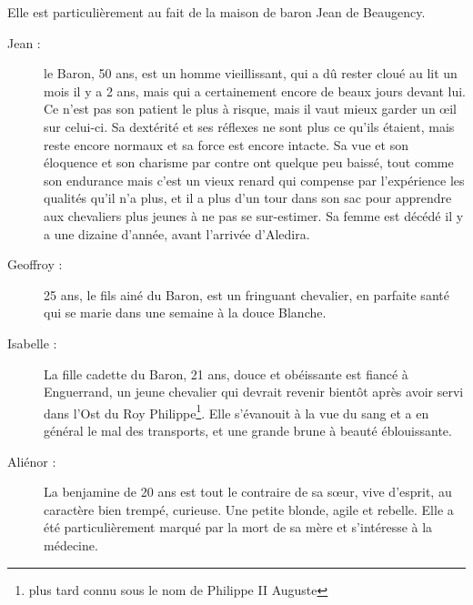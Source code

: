 Elle est particulièrement au fait de la maison de baron Jean de Beaugency.
\begin{description}
\item[Jean :] le Baron, 50 ans, est un homme vieillissant, qui a dû rester cloué au lit un mois
il y a 2 ans, mais qui a certainement encore de beaux jours devant lui. Ce n'est pas son patient le plus à risque, mais il vaut mieux garder un œil sur celui-ci. Sa dextérité et ses réflexes ne sont plus ce qu'ils étaient, mais reste encore normaux et sa force est encore intacte.
Sa vue et son éloquence et son charisme par contre ont quelque peu baissé, tout comme son endurance mais c'est un vieux renard qui compense par l'expérience les qualités qu'il n'a plus, et il a plus d'un tour dans son sac pour apprendre aux chevaliers plus jeunes à ne pas se sur-estimer.
Sa femme est décédé il y a une dizaine d'année, avant l'arrivée d'Aledira.
\item[Geoffroy :] 25 ans, le fils ainé du Baron, est un fringuant chevalier, en parfaite santé qui se marie dans une semaine à la douce Blanche.
\item[Isabelle :] La fille cadette du Baron, 21 ans, douce et obéissante est fiancé à Enguerrand, un jeune chevalier qui devrait revenir bientôt après avoir servi dans l'Ost du Roy Philippe\footnote{plus tard connu sous le nom de Philippe II Auguste}. Elle s'évanouit à la vue du sang et a en général le mal des transports, et une grande brune à beauté éblouissante.
\item[Aliénor :] La benjamine de 20 ans est tout le contraire de sa sœur, vive d'esprit, au caractère bien trempé, curieuse. Une petite blonde, agile et rebelle. Elle a été particulièrement marqué par la mort de sa mère et s'intéresse à la médecine.
\end{description}


